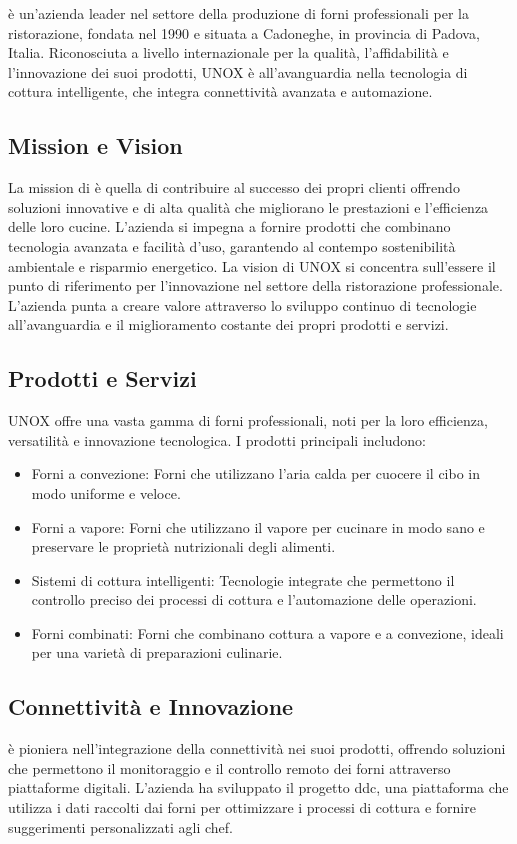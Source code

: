 \myAzienda è un'azienda leader nel settore della produzione di forni professionali per la ristorazione, fondata nel 1990 e situata a Cadoneghe, in provincia di Padova, Italia.
Riconosciuta a livello internazionale per la qualità, l'affidabilità e l'innovazione dei suoi prodotti, UNOX è all'avanguardia nella tecnologia di cottura intelligente, che integra connettività avanzata e automazione.

\subsection*{Mission e Vision}
La mission di \myAzienda è quella di contribuire al successo dei propri clienti offrendo soluzioni innovative e di alta qualità che migliorano le prestazioni e l'efficienza delle loro cucine.
L'azienda si impegna a fornire prodotti che combinano tecnologia avanzata e facilità d'uso, garantendo al contempo sostenibilità ambientale e risparmio energetico.
La vision di UNOX si concentra sull'essere il punto di riferimento per l'innovazione nel settore della ristorazione professionale.
L'azienda punta a creare valore attraverso lo sviluppo continuo di tecnologie all'avanguardia e il miglioramento costante dei propri prodotti e servizi.

\subsection*{Prodotti e Servizi}
UNOX offre una vasta gamma di forni professionali, noti per la loro efficienza, versatilità e innovazione tecnologica.
I prodotti principali includono:
\begin{itemize}
    \item Forni a convezione: Forni che utilizzano l'aria calda per cuocere il cibo in modo uniforme e veloce.
    \item Forni a vapore: Forni che utilizzano il vapore per cucinare in modo sano e preservare le proprietà nutrizionali degli alimenti.
    \item Sistemi di cottura intelligenti: Tecnologie integrate che permettono il controllo preciso dei processi di cottura e l'automazione delle operazioni.
    \item Forni combinati: Forni che combinano cottura a vapore e a convezione, ideali per una varietà di preparazioni culinarie.
\end{itemize}

\subsection*{Connettività e Innovazione}
\myAzienda è pioniera nell'integrazione della connettività nei suoi prodotti, offrendo soluzioni che permettono il monitoraggio e il controllo remoto dei forni attraverso piattaforme digitali.
L'azienda ha sviluppato il progetto \gls{ddc}\glox, una piattaforma che utilizza i dati raccolti dai forni per ottimizzare i processi di cottura e fornire suggerimenti personalizzati agli chef.

